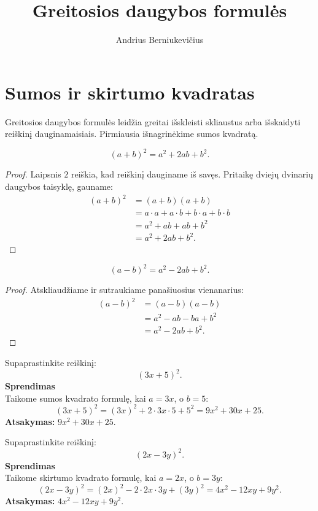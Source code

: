 \documentclass[11pt,a4paper]{scrartcl}
\title{Greitosios daugybos formulės}
\author{Andrius Berniukevičius}
\begin{document}
\maketitle

\section{Sumos ir skirtumo kvadratas}

Greitosios daugybos formulės leidžia greitai išskleisti skliaustus arba išskaidyti reiškinį dauginamaisiais. Pirmiausia išnagrinėkime sumos kvadratą.

\begin{property}
\[
(a+b)^2=a^2+2ab+b^2.
\]
\end{property}

\begin{proof}
Laipsnis $2$ reiškia, kad reiškinį dauginame iš savęs. Pritaikę dviejų dvinarių daugybos taisyklę, gauname:
\[
\begin{aligned}
(a+b)^2&=(a+b)(a+b)\\
&=a\cdot a+a\cdot b+b\cdot a+b\cdot b\\
&=a^2+ab+ab+b^2\\
&=a^2+2ab+b^2.
\end{aligned}
\]
\end{proof}

\begin{property}
\[
(a-b)^2=a^2-2ab+b^2.
\]
\end{property}

\begin{proof}
 Atskliaudžiame ir sutraukiame panašiuosius vienanarius:
\[
\begin{aligned}
(a-b)^2&=(a-b)(a-b)\\
&=a^2-ab-ba+b^2\\
&=a^2-2ab+b^2.
\end{aligned}
\]
\end{proof}

\begin{example}
Supaprastinkite reiškinį:
\[
(3x+5)^2.
\]
\textbf{Sprendimas}\\
Taikome sumos kvadrato formulę, kai $a=3x$, o $b=5$:
\[
(3x+5)^2=(3x)^2+2\cdot3x\cdot5+5^2=9x^2+30x+25.
\]
\textbf{Atsakymas:} $9x^2+30x+25$.
\end{example}

\begin{example}
Supaprastinkite reiškinį:
\[
(2x-3y)^2.
\]
\textbf{Sprendimas}\\
Taikome skirtumo kvadrato formulę, kai $a=2x$, o $b=3y$:
\[
(2x-3y)^2=(2x)^2-2\cdot2x\cdot3y+(3y)^2=4x^2-12xy+9y^2.
\]
\textbf{Atsakymas:} $4x^2-12xy+9y^2$.
\end{example}
\end{document}

